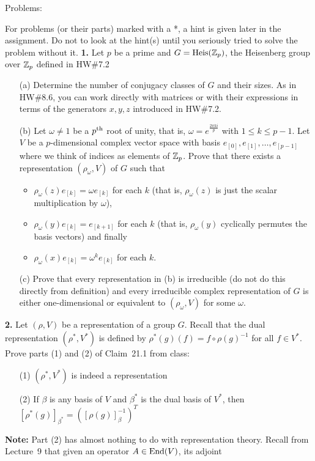 \documentclass[12pt]{amsart}
\begin{document}
\bf\centerline{Problems: }\rm
\skv
For problems (or their parts) marked with a *, a hint is given later in the assignment. Do not to look at the hint(s) until you seriously tried to solve the problem without it.
\skv
{\bf 1.} Let $p$ be a prime and $G={\rm Heis}({\mathbb Z}_p)$, the Heisenberg group over ${\mathbb Z}_p$ defined in HW\#7.2
\begin{itemize}
\item[(a)] Determine the number of conjugacy classes of $G$ and their sizes. As in HW\#8.6, you can work directly with matrices or 
with their expressions in terms of the generators $x,y,z$ introduced in HW\#7.2.
\item[(b)] Let $\omega\neq 1$ be a $p^{\rm th}$ root of unity, that is, $\omega=e^{\frac{2\pi k i}{p}}$ with $1\leq k\leq p-1$.
Let $V$ be a $p$-dimensional complex vector space with basis $e_{[0]}, e_{[1]},\ldots, e_{[p-1]}$ where we think of indices as elements of ${\mathbb Z}_p$.
Prove that there exists a representation $(\rho_{\omega},V)$ of $G$ such that
\begin{itemize}
\item $\rho_{\omega}(z) e_{[k]}=\omega e_{[k]}$ for each $k$ (that is, $\rho_{\omega}(z)$ is just the scalar multiplication by $\omega$),
\item $\rho_{\omega}(y) e_{[k]}=e_{[k+1]}$ for each $k$ (that is, $\rho_{\omega}(y)$ cyclically permutes the basis vectors) and finally 
\item $\rho_{\omega}(x) e_{[k]}=\omega^{k} e_{[k]}$ for each $k$.
\end{itemize}
\item[(c)] Prove that every representation in (b) is irreducible (do not do this directly from definition) and every irreducible complex representation of $G$ is either one-dimensional 
or equivalent to $(\rho_{\omega},V)$ for some $\omega$.
\end{itemize}
{\bf 2.} Let $(\rho,V)$ be a representation of a group $G$. Recall that the dual representation $(\rho^*,V^*)$ is defined by
$\rho^*(g)(f)=f\circ \rho(g)^{-1}$ for all $f\in V^*$. Prove parts (1) and (2) of Claim~21.1 from class:
\begin{itemize}
\item[(1)] $(\rho^*,V^*)$ is indeed a representation
\item[(2)] If $\beta$ is any basis of $V$ and $\beta^*$ is the dual basis of $V^*$, then $[\rho^*(g)]_{\beta^*}=([\rho(g)]^{-1}_{\beta})^T$
\end{itemize}
\skv
{\bf Note:} Part (2) has almost nothing to do with representation theory. Recall from Lecture~9 that given an operator $A\in \mathrm {End}(V)$, its adjoint
\end{document}
